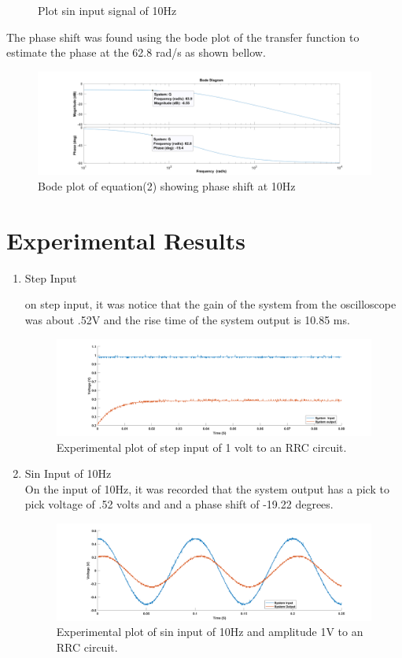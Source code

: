 \documentclass[12pt,letterpaper]{article}
\begin{document}
\begin{itemize}
\begin{enumerate}
\begin{figure}[h]
            \caption{Plot sin input signal of 10Hz }
        \end{figure}
        The phase shift was found using the bode plot of the transfer function to 
        estimate the phase at the 62.8 rad/s as shown bellow.
        \begin{figure}[h]
            \includegraphics[width=17cm]{bode_plot.png}
            \caption{Bode plot of equation(2) showing phase shift at 10Hz}
        \end{figure}
    \end{enumerate}
\end{itemize}
\section*{Experimental Results} 
\begin{enumerate}
    \item Step Input
    
    on step input, it was notice that the gain of the system from the oscilloscope
    was about .52V and the rise time of the system output is 10.85 ms.\\
    \begin{figure}[h]
        \includegraphics[width=17cm]{sep_exp.png}
        \caption{Experimental plot of step input of 1 volt to an RRC circuit.}
    \end{figure}
    \item Sin Input of 10Hz\\
    On the input of 10Hz, it was recorded that the system output has a pick to pick voltage of 
    .52 volts and and a phase shift of -19.22 degrees.
    \begin{figure}[h]
        \includegraphics[width=17cm]{wave_exp.png}
        \caption{Experimental plot of sin input of 10Hz and amplitude 1V to an RRC circuit.}
    \end{figure}
\end{enumerate}
\end{document}
